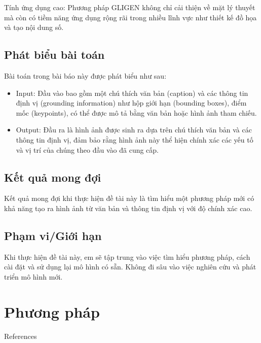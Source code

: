 \documentclass[12pt]{report}
\begin{document}
Tính ứng dụng cao: Phương pháp GLIGEN không chỉ cải thiện về mặt lý thuyết
mà còn có tiềm năng ứng dụng rộng rãi trong nhiều lĩnh vực như thiết kế đồ họa
và tạo nội dung số.

\section{Phát biểu bài toán}

Bài toán trong bài báo này được phát biểu như sau:
\begin{itemize}
	\item Input: Đầu vào bao gồm một chú thích văn bản (caption)
	      và các thông tin định vị (grounding information) như hộp giới hạn (bounding boxes),
	      điểm mốc (keypoints), có thể được mô tả bằng văn bản hoặc hình ảnh tham chiếu.
	\item Output: Đầu ra là hình ảnh được sinh ra dựa trên chú thích văn bản
	      và các thông tin định vị, đảm bảo rằng hình ảnh này thể hiện chính xác các yếu tố
	      và vị trí của chúng theo đầu vào đã cung cấp.
\end{itemize}

\section{Kết quả mong đợi}
Kết quả mong đợi khi thực hiện đề tài này là tìm hiểu một phương pháp mới
có khả năng tạo ra hình ảnh từ văn bản và thông tin định vị với độ chính xác cao.

\section{Phạm vi/Giới hạn}
Khi thực hiện đề tài này, em sẽ tập trung vào việc tìm hiểu phương pháp,
cách cài đặt và sử dụng lại mô hình có sẵn.
Không đi sâu vào việc nghiên cứu và phát triển mô hình mới.

\chapter{Phương pháp}



\newpage
 {References}
\end{document}
